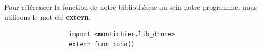 \documentclass[12pt, openany]{report}
\begin{document}
Pour référencer la fonction de notre bibliothèque au sein notre programme, nous utilisons le mot-clé \textbf{extern}.
   \begin{figure}[h!]
        \begin{center}
            \begin{Verbatim}
            import <monFichier.lib_drone>
            extern func toto()
            \end{Verbatim}
        \end{center}
    \end{figure}
%
%
%
\end{document}
